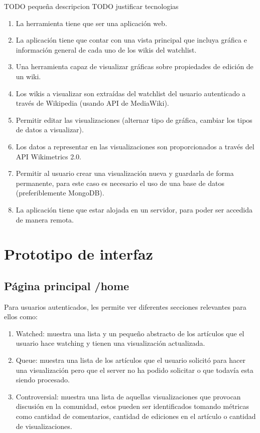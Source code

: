     TODO pequeña descripcion
    TODO justificar tecnologias

\begin{enumerate}
    \item{La herramienta tiene que ser una aplicación web.}
    \item{La aplicación tiene que contar con una vista principal que incluya gráfica e información general de cada uno de los wikis del watchlist.}
    \item{Una herramienta capaz de visualizar gráficas sobre propiedades de edición de un wiki.}
    \item{Los wikis a visualizar son extraídas del watchlist del usuario autenticado a través de Wikipedia (usando API de MediaWiki).}
    \item{Permitir editar las visualizaciones (alternar tipo de gráfica, cambiar los tipos de datos a visualizar).}
    \item{Los datos a representar en las visualizaciones son proporcionados a través del API Wikimetrics 2.0.}
    \item{Permitir al usuario crear una visualización nueva y guardarla de forma permanente, para este caso es necesario el uso de una base de datos (preferiblemente MongoDB).}
    \item{La aplicación tiene que estar alojada en un servidor, para poder ser accedida de manera remota.}
\end{enumerate}

\section{Prototipo de interfaz}

\subsection{Página principal /home}
Para usuarios autenticados, les permite ver diferentes secciones relevantes para ellos como: 
\begin{enumerate}
    \item Watched: muestra una lista y un pequeño abstracto de los artículos que el usuario hace watching y tienen una visualización actualizada.
    \item Queue: muestra una lista de los artículos que el usuario solicitó para hacer una visualización pero que el server no ha podido solicitar o que todavía esta siendo procesado.
    \item Controversial: muestra una lista de aquellas visualizaciones que provocan discusión en la comunidad, estos pueden ser identificados tomando métricas como cantidad de comentarios, cantidad de ediciones en el artículo o cantidad de visualizaciones.
\end{enumerate}

